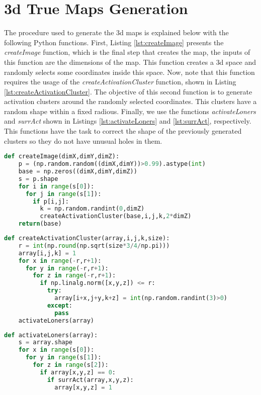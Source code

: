 \chapter{\texorpdfstring{\gls{3d}}{3D} True Maps Generation}
\label{ap:3dMapsGen}

The procedure used to generate the \gls{3d} maps is explained below
with the following Python functions. First, Listing 
\ref{lst:createImage} presents the \textit{createImage} function,
which is the final step that creates the map, the inputs 
of this function are the dimensions of the map. This function creates a
\gls{3d} space and randomly selects some coordinates inside this space.
Now, note that this function requires the usage of the 
\textit{createActivationCluster} function, shown in 
Listing \ref{lst:createActivationCluster}. The objective of this second
function is to generate activation clusters around the randomly selected
coordinates. This clusters have a random shape within a fixed radious.
Finally, we use the functions \textit{activateLoners} and \textit{surrAct} shown 
in Listings \ref{lst:activateLoners} and \ref{lst:surrAct}, respectively. This 
functions have the task to correct the shape of the previously generated clusters
so they do not have unusual holes in them.

\begin{lstlisting}[language=Python, caption=\textit{createImage} Function, label=lst:createImage]
def createImage(dimX,dimY,dimZ):
    p = (np.random.random((dimX,dimY))>0.99).astype(int)
    base = np.zeros((dimX,dimY,dimZ))
    s = p.shape
    for i in range(s[0]):
      for j in range(s[1]):
        if p[i,j]:
          k = np.random.randint(0,dimZ)
          createActivationCluster(base,i,j,k,2*dimZ)
    return(base)
\end{lstlisting}

\begin{lstlisting}[language=Python, caption=\textit{createActivationCluster} Function, label=lst:createActivationCluster]
def createActivationCluster(array,i,j,k,size):
    r = int(np.round(np.sqrt(size*3/4/np.pi)))
    array[i,j,k] = 1
    for x in range(-r,r+1):
      for y in range(-r,r+1):
        for z in range(-r,r+1):
          if np.linalg.norm([x,y,z]) <= r:
            try:
              array[i+x,j+y,k+z] = int(np.random.randint(3)>0)
            except:
              pass
    activateLoners(array)
\end{lstlisting}

\begin{lstlisting}[language=Python, caption=\textit{activateLoners} Function, label=lst:activateLoners]
def activateLoners(array):
    s = array.shape
    for x in range(s[0]):
      for y in range(s[1]):
        for z in range(s[2]):
          if array[x,y,z] == 0:
            if surrAct(array,x,y,z):
              array[x,y,z] = 1
\end{lstlisting}

